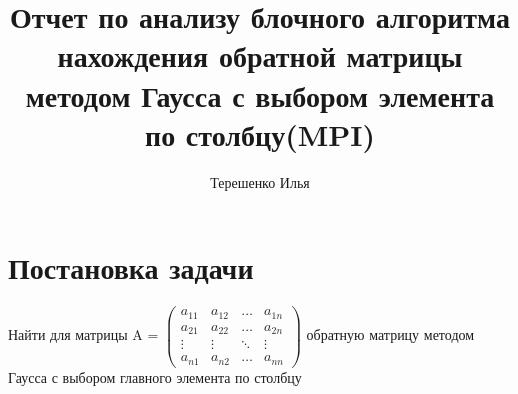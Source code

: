 \documentclass[12pt, a4paper]{article}
\title{Отчет по анализу блочного алгоритма нахождения обратной матрицы методом Гаусса с выбором элемента по столбцу(MPI)}
\author{Терешенко Илья}
\begin{document}
\maketitle

\section{Постановка задачи}
Найти для матрицы A = $\begin{pmatrix}
     a_{11}& a_{12} &\ldots & a_{1n}\\
     a_{21}& a_{22} &\ldots & a_{2n}\\
     \vdots& \vdots &\ddots & \vdots\\
     a_{n1}& a_{n2} &\ldots & a_{nn}    
    \end{pmatrix}$ обратную матрицу методом Гаусса с выбором главного элемента по столбцу
\end{document}
